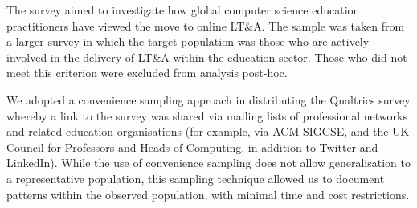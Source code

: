 \documentclass[sigconf]{acmart}
\begin{document}

The survey aimed to investigate how global computer science education
practitioners have viewed the move to online LT\&A. The sample was
taken from a larger survey in which the target population was those
who are actively involved in the delivery of LT\&A within the
education sector. Those who did not meet this criterion were excluded
from analysis post-hoc.


We adopted a convenience sampling approach in distributing the
Qualtrics survey whereby a link to the survey was shared via mailing
lists of professional networks and related education organisations
(for example, via ACM SIGCSE, and the UK Council for Professors and
Heads of Computing, in addition to Twitter and LinkedIn). While the
use of convenience sampling does not allow generalisation to a
representative population, this sampling technique allowed us to
document patterns within the observed population, with minimal time
and cost restrictions.

\end{document}
